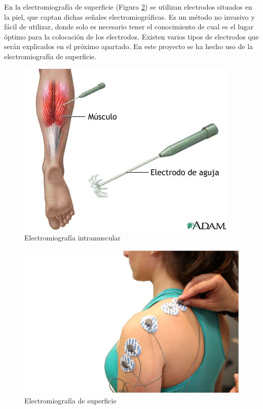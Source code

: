 En la electromiografía de superficie (Figura \ref{fig:superficial}) se utilizan electrodos situados en la piel, que captan dichas señales electromiográficas. Es un método no invasivo y fácil de utilizar, donde solo es necesario tener el conocimiento de cual es el lugar óptimo para la colocación de los electrodos. Existen varios tipos de electrodos que serán explicados en el próximo apartado. En este proyecto se ha hecho uso de la electromiografía de superficie.


\begin{figure}[!ht]
\centering
\includegraphics[scale=0.4]{imagenes/electrodo intramuscular.jpg}
\caption{Electromiografía intramuscular \cite{electrodoIntramuscular}}
\label{fig:intramuscular}
\end{figure}


\begin{figure}[!ht]
\centering
\includegraphics[scale=0.4]{imagenes/electrodo de superficie.jpg}
\caption{Electromiografía de superficie \cite{electrodoSuperficial}}
\label{fig:superficial}
\end{figure}



